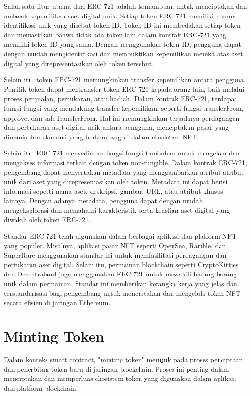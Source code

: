 Salah satu fitur utama dari ERC-721 adalah kemampuan untuk menciptakan dan melacak kepemilikan aset digital unik. Setiap token ERC-721 memiliki nomor identifikasi
unik yang disebut token ID. Token ID ini membedakan setiap token dan memastikan bahwa tidak ada token lain dalam kontrak ERC-721 yang memiliki token ID yang sama.
Dengan menggunakan token ID, pengguna dapat dengan mudah mengidentifikasi dan membuktikan kepemilikan mereka atas aset digital yang direpresentasikan oleh token tersebut.

Selain itu, token ERC-721 memungkinkan transfer kepemilikan antara pengguna. Pemilik token dapat mentransfer token ERC-721 kepada orang lain, baik melalui proses
penjualan, pertukaran, atau hadiah. Dalam kontrak ERC-721, terdapat fungsi-fungsi yang mendukung transfer kepemilikan, seperti fungsi transferFrom, approve, dan safeTransferFrom.
Hal ini memungkinkan terjadinya perdagangan dan pertukaran aset digital unik antara pengguna, menciptakan pasar yang dinamis dan ekonomi yang berkembang di dalam ekosistem NFT.

Selain itu, ERC-721 menyediakan fungsi-fungsi tambahan untuk mengelola dan mengakses informasi terkait dengan token non-fungible. Dalam kontrak ERC-721,
pengembang dapat menyertakan metadata yang menggambarkan atribut-atribut unik dari aset yang direpresentasikan oleh token. Metadata ini dapat berisi informasi seperti
nama aset, deskripsi, gambar, URL, atau atribut khusus lainnya. Dengan adanya metadata, pengguna dapat dengan mudah mengeksplorasi dan memahami karakteristik serta keaslian aset digital yang diwakili oleh token ERC-721.

Standar ERC-721 telah digunakan dalam berbagai aplikasi dan platform NFT yang populer. Misalnya, aplikasi pasar NFT seperti OpenSea, Rarible, dan SuperRare menggunakan
standar ini untuk memfasilitasi perdagangan dan pertukaran aset digital. Selain itu, permainan blockchain seperti CryptoKitties dan Decentraland juga menggunakan
ERC-721 untuk mewakili barang-barang unik dalam permainan. Standar ini memberikan kerangka kerja yang jelas dan terstandarisasi bagi pengembang untuk menciptakan dan mengelola token NFT secara efisien di jaringan Ethereum. \parencite{erc721}

\section{Minting Token}
Dalam konteks smart contract, "minting token" merujuk pada proses penciptaan dan penerbitan token baru di jaringan blockchain. Proses ini penting dalam menciptakan dan memperluas ekosistem token yang digunakan dalam aplikasi dan platform blockchain.

